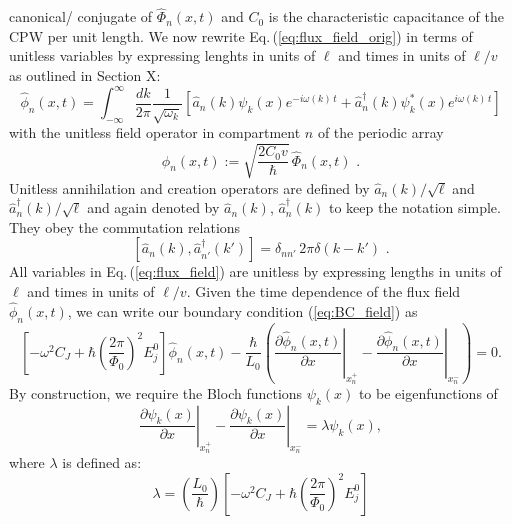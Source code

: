 canonical/ conjugate of $\hat{\Phi}_n(x,t)$ and $C_0$ is the characteristic capacitance of the CPW per unit length. 
%
We now rewrite Eq.\,(\ref{eq:flux_field_orig}) in terms of unitless variables 
by expressing lenghts in units of $\ell$ and times in units of $\ell/v$
as outlined in \color{red} Section X:  \color{blue}  
%
\begin{equation} \label{eq:flux_field}
    \hat{\phi}_n(x,t) = 
    \int_{-\infty}^{\infty}\frac{dk}{2 \pi} \frac{1}{\sqrt{\omega_k}}
    \left[ \hat{a}_n(k) \psi_k(x)e^{-i \omega(k) \, t} + 
    \hat{a}_n^{\dagger}(k) \psi_k^*(x) e^{i \omega(k) \, t} \right]
\end{equation}
%
with the unitless field operator in compartment $n$ of the periodic array
%
\begin{equation} \label{eq:ufo}
\hat{\phi}_n(x,t) := \sqrt{\frac{2 C_0 v}{\hbar}} \, \hat{\Phi}_n(x,t) \, \, .
\end{equation}
%
Unitless annihilation and creation operators are defined by $\hat{a}_n(k)/\sqrt{\ell}$ 
and ${\hat a}_{n}^\dagger(k) / \sqrt{\ell}$ and again denoted by
$\hat{a}_n(k)$, ${\hat a}_{n}^\dagger(k)$ to keep the notation simple. 
They obey the commutation relations 
%
\begin{equation} \label{eq:cra}
    \left[ \hat{a}_n(k),{\hat a}_{n'}^\dagger(k') \right] = \delta_{nn'} \, 2 \pi \delta(k - k') \, \, .
\end{equation}
%
All variables in Eq.\,(\ref{eq:flux_field}) are unitless by expressing lengths in units of $\ell$
and times in units of $\ell/v$.
%
\color{black}
%
%
Given the time dependence of the flux field $\hat{\phi}_n(x,t)$, we can write our boundary condition (\ref{eq:BC_field}) as
%
\begin{equation}
\left[-\omega^2 C_{J}+\hbar\left(\frac{2 \pi}{\Phi_{0}}\right)^{2} E_{j}^0\right]\hat{\phi}_n(x,t) -\frac{\hbar}{L_{0}}\left(\left.\frac{\partial \hat{\phi}_n(x,t)}{\partial x}\right|_{x_n^{+}}-\left.\frac{\partial \hat{\phi}_n(x,t)}{\partial x}\right|_{x_n^{-}}\right)=0.
\end{equation}
%
By construction, we require the Bloch functions $\psi_k(x)$ to be eigenfunctions of
%
\begin{equation}\label{eq:bloch_eigenvalproblem}
\left.\frac{\partial\psi_{k}(x)}{\partial x}\right|_{x_n^{+}}-\left.\frac{\partial\psi_{k}(x)}{\partial x}\right|_{x_n^{-}}=\lambda \psi_k(x),
\end{equation}
%
where $\lambda$ is defined as:
%
\begin{equation}
\lambda = \left(\frac{L_0}{\hbar}\right)  
\left[-\omega^2 C_{J}+\hbar\left(\frac{2 \pi}{\Phi_{0}}\right)^{2} E_{j}^0\right]
\end{equation}
